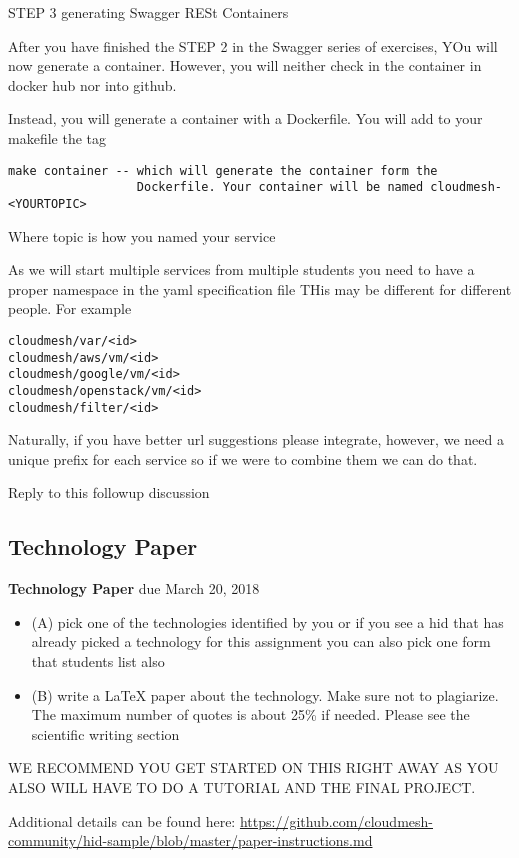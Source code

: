 \begin{exercise}

STEP 3 generating Swagger RESt Containers

After you have finished the STEP 2 in the Swagger series of exercises,
YOu will now generate a container. However, you will neither check in
the container in docker hub nor into github.

 

Instead, you will generate a container with a Dockerfile. You will add
to your makefile the tag

 
\begin{lstlisting}
make container -- which will generate the container form the
                  Dockerfile. Your container will be named cloudmesh-<YOURTOPIC>
\end{lstlisting}

Where topic is how you named your service

As we will start multiple services from multiple students you need to
have a proper namespace in the yaml specification file THis may be
different for different people. For example

 
\begin{lstlisting}
cloudmesh/var/<id>
cloudmesh/aws/vm/<id>
cloudmesh/google/vm/<id>
cloudmesh/openstack/vm/<id>
cloudmesh/filter/<id>
\end{lstlisting}

 

Naturally, if you have better url suggestions please integrate,
however, we need a unique prefix for each service so if we were to
combine them we can do that.

Reply to this followup discussion
\end{exercise}

\subsection{Technology Paper}
\label{E:616-tech-paper}

\begin{exercise} {\bf Technology Paper} due March 20, 2018

\begin{itemize}
Read the following two points to assist you in starting your paper 
\item (A) pick one of the technologies identified by you or if you see a
  hid that has already picked a technology for this assignment you can
  also pick one form that students list also

\item (B) write a LaTeX paper about the technology. Make sure not to
  plagiarize. The maximum number of quotes is about 25\% if
  needed. Please see the scientific writing section

\end{itemize}
 WE RECOMMEND YOU GET STARTED ON THIS RIGHT AWAY AS YOU ALSO WILL HAVE
 TO DO A TUTORIAL AND THE FINAL PROJECT.

Additional details can be found here:
\url{https://github.com/cloudmesh-community/hid-sample/blob/master/paper-instructions.md}

\end{exercise}

